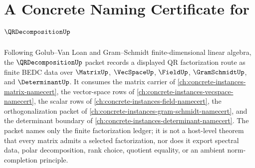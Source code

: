 \chapter{A Concrete Naming Certificate for $\QRDecompositionUp$}
\label{ch:concrete-instances-qr-decomposition-namecert}

Following Golub--Van Loan and Gram--Schmidt finite-dimensional linear algebra, the $\QRDecompositionUp$ packet records a displayed QR factorization route as finite BEDC data over $\MatrixUp$, $\VecSpaceUp$, $\FieldUp$, $\GramSchmidtUp$, and $\DeterminantUp$. It consumes the matrix carrier of \autoref{ch:concrete-instances-matrix-namecert}, the vector-space rows of \autoref{ch:concrete-instances-vecspace-namecert}, the scalar rows of \autoref{ch:concrete-instances-field-namecert}, the orthogonalization packet of \autoref{ch:concrete-instances-gram-schmidt-namecert}, and the determinant boundary of \autoref{ch:concrete-instances-determinant-namecert}. The packet names only the finite factorization ledger; it is not a host-level theorem that every matrix admits a selected factorization, nor does it export spectral data, polar decomposition, rank choice, quotient equality, or an ambient norm-completion principle.

